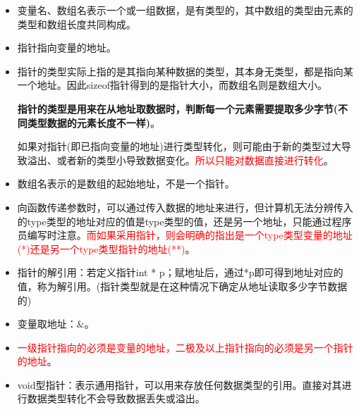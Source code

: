 \documentclass[UTF8]{article}%
\begin{document}
\begin{itemize}
    \item 变量名、数组名表示一个或一组数据，是有类型的，其中数组的类型由元素的类型和数组长度共同构成。
    \item 指针指向变量的地址。
    \item 指针的类型实际上指的是其指向某种数据的类型，其本身无类型，都是指向某一个地址。因此sizeof指针得到的是指针大小，而数组名则是数组大小。
    
    \textbf{指针的类型是用来在从地址取数据时，判断每一个元素需要提取多少字节(不同类型数据的元素长度不一样)}。
    
    如果对指针(即已指向变量的地址)进行类型转化，则可能由于新的类型过大导致溢出、或者新的类型小导致数据变化。\textcolor{red}{所以只能对数据直接进行转化}。

    \item 数组名表示的是数组的起始地址，不是一个指针。
    \item 向函数传递参数时，可以通过传入数据的地址来进行，但计算机无法分辨传入的type类型的地址对应的值是type类型的值，还是另一个地址，只能通过程序员编写时注意。\textcolor{red}{而如果采用指针，则会明确的指出是一个type类型变量的地址(*)还是另一个type类型指针的地址(**)}。
    \item 指针的解引用：若定义指针int * p；赋地址后，通过*p即可得到地址对应的值，称为解引用。(指针类型就是在这种情况下确定从地址读取多少字节数据的)
    \item 变量取地址：$\&$。
    \item \textcolor{red}{一级指针指向的必须是变量的地址，二极及以上指针指向的必须是另一个指针的地址}。
    \item void型指针：表示通用指针，可以用来存放任何数据类型的引用。直接对其进行数据类型转化不会导致数据丢失或溢出。
\end{itemize}
\end{document}
